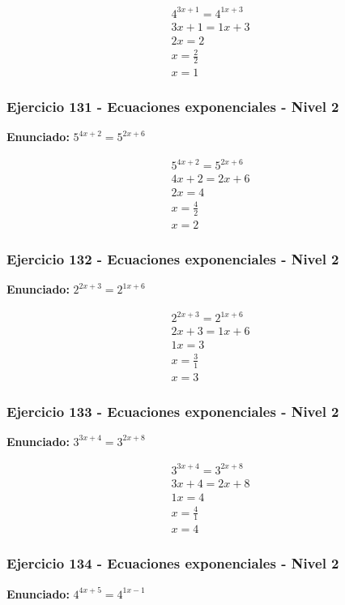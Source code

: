 \documentclass[12pt,a4paper]{article}
\begin{document}
\[
\begin{aligned}
4^{3x+1}=4^{1x+3}\\
3x+1=1x+3\\
2x=2\\
x=\frac{2}{2}\\
\boxed{x=1}
\end{aligned}
\]


\subsubsection*{Ejercicio 131 - Ecuaciones exponenciales - Nivel 2}
\textbf{Enunciado:} \(5^{4x+2}=5^{2x+6}\)

\[
\begin{aligned}
5^{4x+2}=5^{2x+6}\\
4x+2=2x+6\\
2x=4\\
x=\frac{4}{2}\\
\boxed{x=2}
\end{aligned}
\]


\subsubsection*{Ejercicio 132 - Ecuaciones exponenciales - Nivel 2}
\textbf{Enunciado:} \(2^{2x+3}=2^{1x+6}\)

\[
\begin{aligned}
2^{2x+3}=2^{1x+6}\\
2x+3=1x+6\\
1x=3\\
x=\frac{3}{1}\\
\boxed{x=3}
\end{aligned}
\]


\subsubsection*{Ejercicio 133 - Ecuaciones exponenciales - Nivel 2}
\textbf{Enunciado:} \(3^{3x+4}=3^{2x+8}\)

\[
\begin{aligned}
3^{3x+4}=3^{2x+8}\\
3x+4=2x+8\\
1x=4\\
x=\frac{4}{1}\\
\boxed{x=4}
\end{aligned}
\]


\subsubsection*{Ejercicio 134 - Ecuaciones exponenciales - Nivel 2}
\textbf{Enunciado:} \(4^{4x+5}=4^{1x-1}\)
\end{document}
